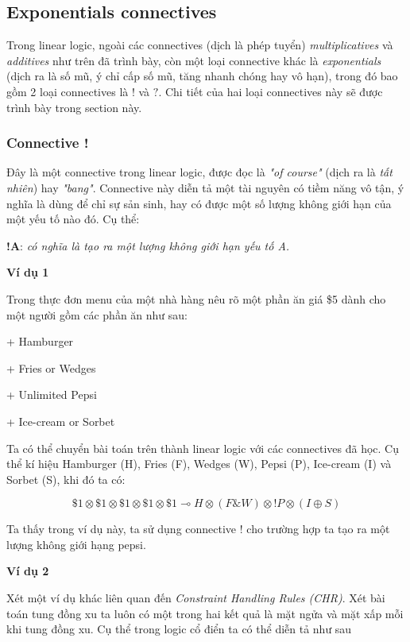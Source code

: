 \subsection{Exponentials connectives}
Trong linear logic, ngoài các connectives (dịch là phép tuyển) \textit{multiplicatives} và \textit{additives} như trên đã trình bày, còn một loại connective khác là \textit{exponentials} (dịch ra là số mũ, ý chỉ cấp số mũ, tăng nhanh chóng hay vô hạn), trong đó bao gồm 2 loại connectives là $ ! $ và $ ? $. Chi tiết của hai loại connectives này sẽ được trình bày trong section này.

\subsubsection{Connective !}
Đây là một connective trong linear logic, được đọc là \textit{"of course"} (dịch ra là \textit{tất nhiên}) hay \textit{"bang"}. Connective này diễn tả một tài nguyên có tiềm năng vô tận, ý nghĩa là dùng để chỉ sự sản sinh, hay có được một số lượng không giới hạn của một yếu tố nào đó. Cụ thể:

\begin{center}
	\textbf{!A}: \textit{có nghĩa là tạo ra một lượng không giới hạn yếu tố A.}
\end{center}


\textbf{Ví dụ 1} 

Trong thực đơn menu của một nhà hàng nêu rõ một phần ăn giá \$5 dành cho một người gồm các phần ăn như sau:

+ Hamburger

+ Fries or Wedges

+ Unlimited Pepsi

+ Ice-cream or Sorbet

Ta có thể chuyển bài toán trên thành linear logic với các connectives đã học. Cụ thể kí hiệu Hamburger (H), Fries (F), Wedges (W), Pepsi (P), Ice-cream (I) và Sorbet (S), khi đó ta có:

$$ \$1 \otimes \$1 \otimes \$1 \otimes \$1 \otimes \$1 \multimap  H \otimes (F \& W) \otimes !P \otimes (I \oplus S) $$

Ta thấy trong ví dụ này, ta sử dụng connective $ ! $ cho trường hợp ta tạo ra một lượng không giới hạng pepsi.

\vspace{0.5cm}
\textbf{Ví dụ 2}

Xét một ví dụ khác liên quan đến \textit{Constraint Handling Rules (CHR)}. Xét bài toán tung đồng xu ta luôn có một trong hai kết quả là mặt ngửa và mặt xấp mỗi khi tung đồng xu. Cụ thể trong logic cổ điển ta có thể diễn tả như sau

